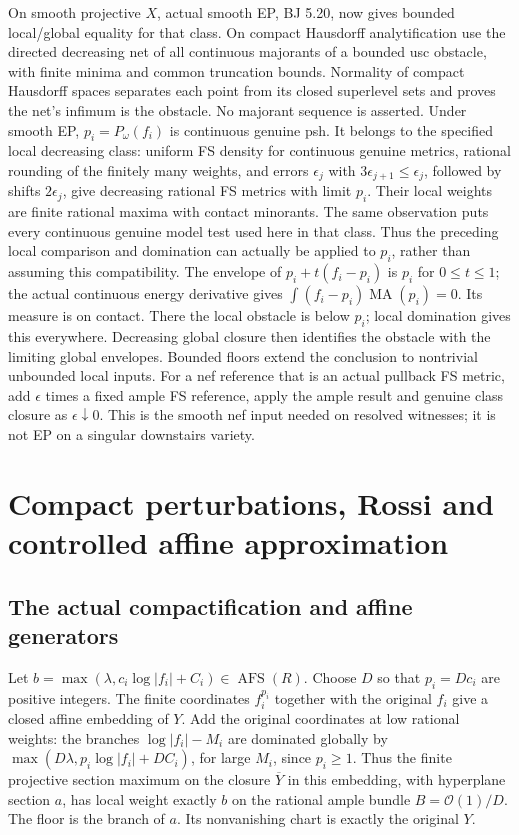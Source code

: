 \documentclass[
  11pt,
]{article}
\begin{document}
On smooth projective \(X\), actual smooth EP, BJ 5.20, now gives bounded
local/global equality for that class. On compact Hausdorff
analytification use the directed decreasing net of all continuous
majorants of a bounded usc obstacle, with finite minima and common
truncation bounds. Normality of compact Hausdorff spaces separates each
point from its closed superlevel sets and proves the net's infimum is
the obstacle. No majorant sequence is asserted. Under smooth EP,
\(p_i=P_\omega(f_i)\) is continuous genuine psh. It belongs to the
specified local decreasing class: uniform FS density for continuous
genuine metrics, rational rounding of the finitely many weights, and
errors \(\epsilon_j\) with \(3\epsilon_{j+1}\le\epsilon_j\), followed by
shifts \(2\epsilon_j\), give decreasing rational FS metrics with limit
\(p_i\). Their local weights are finite rational maxima with contact
minorants. The same observation puts every continuous genuine model test
used here in that class. Thus the preceding local comparison and
domination can actually be applied to \(p_i\), rather than assuming this
compatibility. The envelope of \(p_i+t(f_i-p_i)\) is \(p_i\) for
\(0\le t\le1\); the actual continuous energy derivative gives
\(\int(f_i-p_i)\operatorname{MA}(p_i)=0\). Its measure is on contact.
There the local obstacle is below \(p_i\); local domination gives this
everywhere. Decreasing global closure then identifies the obstacle with
the limiting global envelopes. Bounded floors extend the conclusion to
nontrivial unbounded local inputs. For a nef reference that is an actual
pullback FS metric, add \(\epsilon\) times a fixed ample FS reference,
apply the ample result and genuine class closure as
\(\epsilon\downarrow0\). This is the smooth nef input needed on resolved
witnesses; it is not EP on a singular downstairs variety.

\section{Compact perturbations, Rossi and controlled affine
approximation}\label{compact-perturbations-rossi-and-controlled-affine-approximation}

\subsection{The actual compactification and affine
generators}\label{the-actual-compactification-and-affine-generators}

Let \(b=\max(\lambda,c_i\log|f_i|+C_i)\in\operatorname{AFS}(R)\). Choose
\(D\) so that \(p_i=Dc_i\) are positive integers. The finite coordinates
\(f_i^{p_i}\) together with the original \(f_i\) give a closed affine
embedding of \(Y\). Add the original coordinates at low rational
weights: the branches \(\log|f_i|-M_i\) are dominated globally by
\(\max(D\lambda,p_i\log|f_i|+DC_i)\), for large \(M_i\), since
\(p_i\ge1\). Thus the finite projective section maximum on the closure
\(\overline Y\) in this embedding, with hyperplane section \(a\), has
local weight exactly \(b\) on the rational ample bundle
\(B=\mathcal O(1)/D\). The floor is the branch of \(a\). Its
nonvanishing chart is exactly the original \(Y\).
\end{document}
